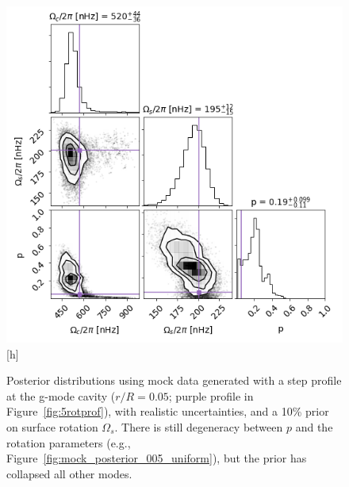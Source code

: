\begin{figure}
\centering
    \includegraphics[width=\textwidth]{Figures/subgiant_chapter_figures/20.05_corner.png}[h]
    \caption{Posterior distributions using mock data generated with a step profile at the g-mode cavity ($r/R = 0.05$; purple profile in Figure~\ref{fig:5rotprof}), with realistic uncertainties, and a 10\% prior on surface rotation $\Omega_s$. There is still degeneracy between $p$ and the rotation parameters (e.g., Figure~\ref{fig:mock_posterior_005_uniform}), but the prior has collapsed all other modes.}
    \label{fig:mock_posterior_005_reject}
\end{figure}

